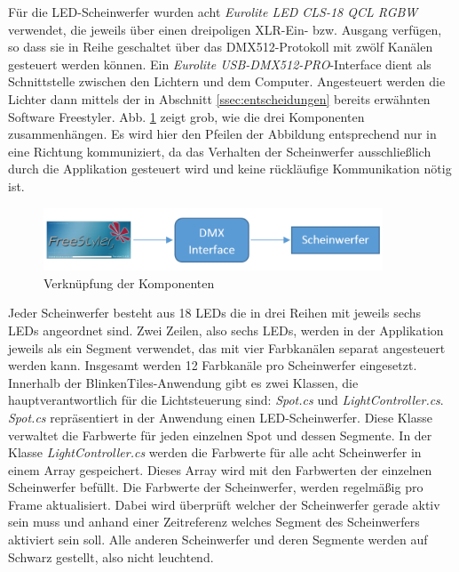 \label{ssec:DMX}

Für die LED-Scheinwerfer wurden acht \emph{Eurolite LED CLS-18 QCL RGBW} verwendet, die jeweils über einen dreipoligen XLR-Ein- bzw. Ausgang verfügen, so dass sie in Reihe geschaltet über das DMX512-Protokoll mit zwölf Kanälen gesteuert werden können. Ein \emph{Eurolite USB-DMX512-PRO}-Interface dient als Schnittstelle zwischen den Lichtern und dem Computer. Angesteuert werden die Lichter dann mittels der in Abschnitt \ref{ssec:entscheidungen} bereits erwähnten Software Freestyler. Abb. \ref{fig:FStoLED} zeigt grob, wie die drei Komponenten zusammenhängen. Es wird hier den Pfeilen der Abbildung entsprechend nur in eine Richtung kommuniziert, da das Verhalten der Scheinwerfer ausschließlich durch die Applikation gesteuert wird und keine rückläufige Kommunikation nötig ist.

\begin{figure}[htbp]
	\centering
		\includegraphics[width=0.90\textwidth]{images/FStoDMXInterfaceToLEDs.PNG}
	\caption{Verknüpfung der Komponenten}
	\label{fig:FStoLED}
\end{figure}

Jeder Scheinwerfer besteht aus 18 LEDs die in drei Reihen mit jeweils sechs LEDs angeordnet sind. Zwei Zeilen, also sechs LEDs, werden in der Applikation jeweils als ein Segment verwendet, das mit vier Farbkanälen separat angesteuert werden kann. Insgesamt werden 12 Farbkanäle pro Scheinwerfer eingesetzt. Innerhalb der BlinkenTiles-Anwendung gibt es zwei Klassen, die hauptverantwortlich für die Lichtsteuerung sind: \emph{Spot.cs} und \emph{LightController.cs}. \emph{Spot.cs} repräsentiert in der Anwendung einen LED-Scheinwerfer. Diese Klasse verwaltet die Farbwerte für jeden einzelnen Spot und dessen Segmente. In der Klasse \emph{LightController.cs} werden die Farbwerte für alle acht Scheinwerfer in einem Array gespeichert. Dieses Array wird mit den Farbwerten der einzelnen Scheinwerfer befüllt. Die Farbwerte der Scheinwerfer, werden regelmäßig pro Frame aktualisiert. Dabei wird überprüft welcher der Scheinwerfer gerade aktiv sein muss und anhand einer Zeitreferenz welches Segment des Scheinwerfers aktiviert sein soll. Alle anderen Scheinwerfer und deren Segmente werden auf Schwarz gestellt, also nicht leuchtend. 

